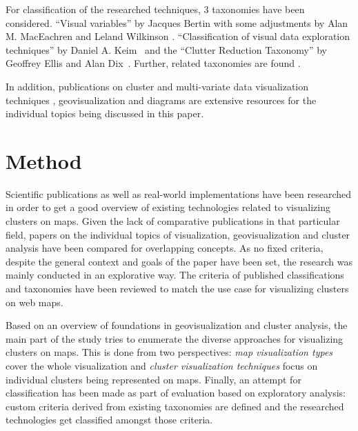 For classification of the researched techniques, 3 taxonomies have been considered. ``Visual variables'' by Jacques Bertin \cite{bertin67graphics, bertin83graphics} with some adjustments by Alan M. MacEachren \cite{MacEachren95maps} and Leland Wilkinson \cite{Wilkinson05grammar}. ``Classification of visual data exploration techniques'' by Daniel A. Keim~\cite{keim2001vis} and the ``Clutter Reduction Taxonomy'' by Geoffrey Ellis and Alan Dix~\cite{ellis08clutter}. Further, related taxonomies are found \cite{lohse, shneiderman}.
 
In addition, publications on cluster and multi-variate data visualization techniques \cite{ward02glyphs, zhang07thesis, ElmqvistDGHF08, hiervis}, geovisualization \cite{noellenburg11geovis, maceachren-geovis, MacEachren07cartovis} and diagrams \cite{ladenhauf12dia} are extensive resources for the individual topics being discussed in this paper.



\section{Method}

Scientific publications as well as real-world implementations have been researched in order to get a good overview of existing technologies related to visualizing clusters on maps. Given the lack of comparative publications in that particular field, papers on the individual topics of visualization, geovisualization and cluster analysis have been compared for overlapping concepts. As no fixed criteria, despite the general context and goals of the paper have been set, the research was mainly conducted in an explorative way. The criteria of published classifications and taxonomies have been reviewed to match the use case for visualizing clusters on web maps.

Based on an overview of foundations in geovisualization and cluster analysis, the main part of the study tries to enumerate the diverse approaches for visualizing clusters on maps. This is done from two perspectives: \textit{map visualization types} cover the whole visualization and \textit{cluster visualization techniques} focus on individual clusters being represented on maps. Finally, an attempt for classification has been made as part of evaluation based on exploratory analysis: custom criteria derived from existing taxonomies are defined and the researched technologies get classified amongst those criteria.







